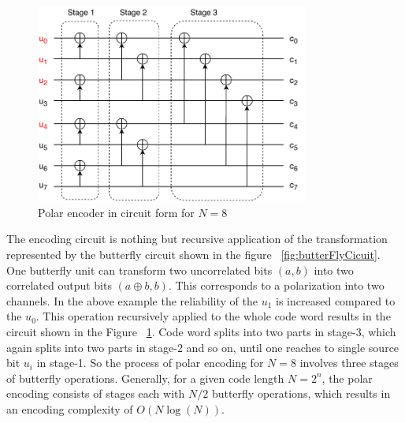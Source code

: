\begin{figure}[h]
	\centering
	\includegraphics[width=0.8\textwidth]{./figures/EncodingCircuitStagesNew.pdf}
	\caption{Polar encoder in circuit form for $N = 8$}
	\label{fig:encoderCircuit}
\end{figure}

The encoding circuit is nothing but recursive application of the transformation represented by the butterfly circuit shown in the figure ~\ref{fig:butterFlyCicuit}. One butterfly unit can transform two uncorrelated bits $(a,b)$ into two correlated output bits $(a\oplus b,b)$. This corresponds to a polarization into two channels. In the above example the reliability of the $u_{1}$ is increased compared to the $u_{0}$. This operation recursively applied to the whole code word results in the circuit shown in the Figure ~\ref{fig:encoderCircuit}. Code word splits into two parts in stage-3, which again splits into two parts in stage-2 and so on, until one reaches to single source bit $u_{i}$ in stage-1. So the process of polar encoding for $N = 8$ involves three stages of butterfly operations. Generally, for a given code length $N=2^{n}$, the polar encoding consists of stages each with $N/2$ butterfly operations, which results in an encoding complexity of $O(N\log(N))$.


